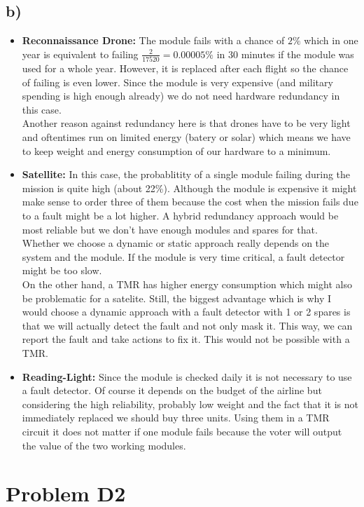 \documentclass[12pt]{article}
\begin{document}
\subsection*{b)}
\begin{itemize}
\item \textbf{Reconnaissance Drone:} The module fails with a chance of $2\%$ which in one year is equivalent to failing $\frac{2}{17520} = 0.00005\%$ in 30 minutes if the module was used for a whole year. However, it is replaced after each flight so the chance of failing is even lower. Since the module is very expensive (and military spending is high enough already) we do not need hardware redundancy in this case.\\
Another reason against redundancy here is that drones have to be very light and oftentimes run on limited energy (batery or solar) which means we have to keep weight and energy consumption of our hardware to a minimum.
\item \textbf{Satellite:} In this case, the probablitity of a single module failing during the mission is quite high (about 22\%). Although the module is expensive it might make sense to order three of them because the cost when the mission fails due to a fault might be a lot higher. A hybrid redundancy approach would be most reliable but we don't have enough modules and spares for that.\\
Whether we choose a dynamic or static approach really depends on the system and the module. If the module is very time critical, a fault detector might be too slow. \\
On the other hand, a TMR has higher energy consumption which might also be problematic for a satelite. Still, the biggest advantage which is why I would choose a dynamic approach with a fault detector with 1 or 2 spares is that we will actually detect the fault and not only mask it. This way, we can report the fault and take actions to fix it. This would not be possible with a TMR.
\item \textbf{Reading-Light:} Since the module is checked daily it is not necessary to use a fault detector. Of course it depends on the budget of the airline but considering the high reliability, probably low weight and the fact that it is not immediately replaced we should buy three units. Using them in a TMR circuit it does not matter if one module fails because the voter will output the value of the two working modules.
\end{itemize}
\section*{Problem D2}
\end{document}
